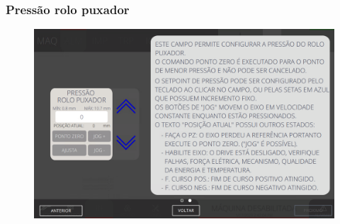 \newpage
\thispagestyle{fancy}
\vspace*{40 pt}
\subsubsection{\small{Pressão rolo puxador}} \label{sec:telaConfiguracoesAlimentacaoPressaoRoloPuxador}
\vspace*{\fill}
\begin{figure}[h]
    \centering
    \includegraphics[width=576 px,height=360 px]{src/imagesICV/03-feeder/settings/3.png}
\end{figure}
\vspace*{\fill}
